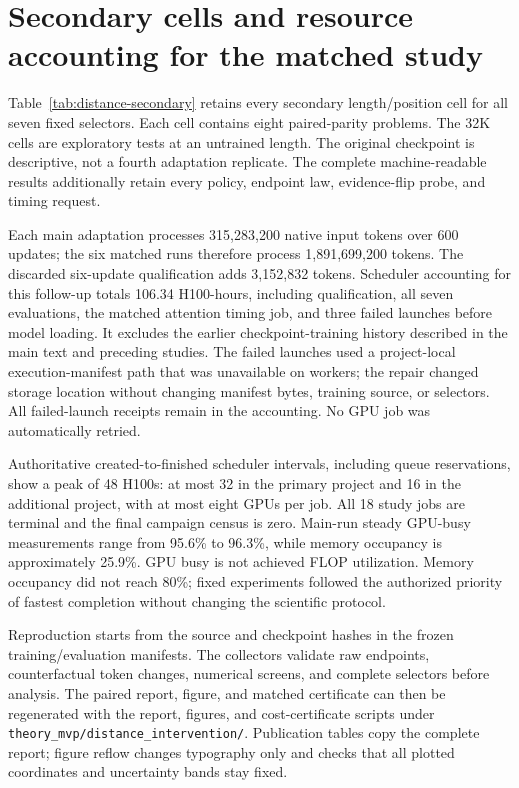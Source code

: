 \section{Secondary cells and resource accounting for the matched study}
\label{app:distance-supplement}
Table~\ref{tab:distance-secondary} retains every secondary length/position
cell for all seven fixed selectors. Each cell contains eight paired-parity
problems. The 32K cells are exploratory tests at an untrained length.
The original checkpoint is descriptive, not a fourth adaptation replicate.
The complete machine-readable results additionally retain every policy,
endpoint law, evidence-flip probe, and timing request.

\begin{table}[h]
\centering\small
\caption{Secondary information-set KL (nats). Seed suffixes 11, 12, 13 denote
20271011, 20271012, 20271013. No cell is removed by a competence gate.
These eight-problem cells are separate from the 32-problem 16K primary panel.}
\resizebox{\linewidth}{!}{}
\label{tab:distance-secondary}
\end{table}

Each main adaptation processes 315,283,200 native input tokens over 600 updates;
the six matched runs therefore process 1,891,699,200 tokens.
The discarded six-update qualification adds 3,152,832 tokens. Scheduler
accounting for this follow-up totals 106.34 H100-hours, including qualification,
all seven evaluations, the matched attention timing job, and three failed
launches before model loading. It excludes the earlier checkpoint-training
history described in the main text and preceding studies.
The failed launches used a project-local execution-manifest path that was
unavailable on workers; the repair changed storage location without changing
manifest bytes, training source, or selectors. All failed-launch receipts
remain in the accounting. No GPU job was automatically retried.

Authoritative created-to-finished scheduler intervals, including queue
reservations, show a peak of 48 H100s: at most 32 in the primary project and 16
in the additional project, with at most eight GPUs per job.
All 18 study jobs are terminal and the final campaign census is zero.
Main-run steady GPU-busy measurements range from 95.6\% to 96.3\%, while memory
occupancy is approximately 25.9\%. GPU busy is not achieved FLOP utilization.
Memory occupancy did not reach 80\%; fixed experiments followed the authorized
priority of fastest completion without changing the scientific protocol.

Reproduction starts from the source and checkpoint hashes in the frozen
training/evaluation manifests. The collectors validate raw endpoints,
counterfactual token changes, numerical screens, and complete selectors before
analysis. The paired report, figure, and matched certificate can then be
regenerated with the report, figures, and cost-certificate scripts under
\texttt{theory\_mvp/distance\_intervention/}.
Publication tables copy the complete report; figure reflow changes typography
only and checks that all plotted coordinates and uncertainty bands stay fixed.
